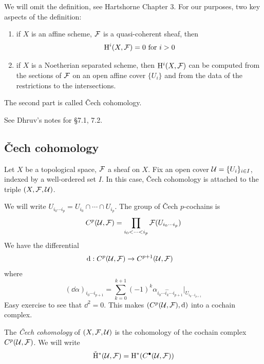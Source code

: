 \documentclass{article}
\begin{document}
\lec

We will omit the definition, see Hartshorne Chapter 3. For our purposes, two key aspects of the definition:
\begin{enumerate}
    \item if \(X\) is an affine scheme, \(\mathcal{F}\) is a quasi-coherent sheaf, then
    \[\mathrm{H}^i(X, \mathcal{F}) = 0 \text{ for }i > 0\]
    \item if \(X\) is a Noetherian separated scheme, then \(\mathrm{H}^i(X, \mathcal{F})\) can be computed from the sections of \(\mathcal{F}\) on an open affine cover \(\{U_i\}\) and from the data of the restrictions to the intersections.
\end{enumerate} 
The second part is called \v Cech cohomology.

See Dhruv's notes for \S7.1, 7.2.

\setcounter{subsection}{2}

\subsection{\v Cech cohomology}

Let \(X\) be a topological space, \(\mathcal{F}\) a sheaf on \(X\). Fix an open cover \(\mathcal{U} = \{U_i\}_{i \in I}\), indexed by a well-ordered set \(I\). In this case, \v Cech cohomology is attached to the triple \((X, \mathcal{F}, \mathcal{U})\).

We will write \(U_{i_0\cdots i_p} = U_{i_0} \cap \cdots \cap U_{i_p}\). The group of \v Cech \(p\)-cochains is
\[C^p(\mathcal{U}, \mathcal{F}) = \prod_{i_0 < \cdots < i_p}\mathcal{F}(U_{i_0\cdots i_p})\]
We have the differential
\begin{align*}
    \dd : C^p(\mathcal{U}, \mathcal{F}) &\to C^{p+1}(\mathcal{U}, \mathcal{F})
\end{align*}
where
\[(\dd\alpha)_{i_0\cdots i_{p+1}} = \sum_{k=0}^{k+1}(-1)^k\alpha_{i_0\cdots \widehat{i_k}\cdots i_{p+1}}\vert_{U_{i_0\cdots i_{p+1}}}\]
Easy exercise to see that \(\dd^2 = 0\). This makes \((C^p(\mathcal{U}, \mathcal{F}), \dd)\) into a cochain complex.

\begin{definition}
    The \emph{\v Cech cohomology} of \((X, \mathcal{F}, \mathcal{U})\) is the cohomology of the cochain complex \(C^p(\mathcal{U}, \mathcal{F})\). We will write
    \[\check{\mathrm{H}}^*(\mathcal{U}, \mathcal{F}) = \mathrm{H}^*(C^\bullet(\mathcal{U}, \mathcal{F}))\]
\end{definition}
\end{document}
